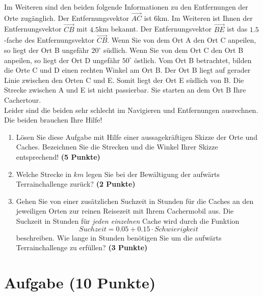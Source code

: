 \documentclass[a4paper, 9pt]{scrartcl}\usepackage[]{graphicx}\usepackage[]{xcolor}
\begin{document}
Im Weiteren sind den beiden folgende Informationen zu den Entfernungen der Orte zugänglich. Der Entfernungsvektor $\overrightarrow{AC}$ ist $6$km. Im Weiteren ist Ihnen der Entfernungsvektor $\overrightarrow{CB}$ mit $4.5$km bekannt. Der Entfernungsvektor $\overrightarrow{BE}$ ist das $1.5$-fache des Entfernungsvektor $\overrightarrow{CB}$. Wenn Sie von dem Ort A den Ort C anpeilen, so liegt der Ort B ungefähr $20^\circ$ südlich. Wenn Sie von dem Ort C den Ort B anpeilen, so liegt der Ort D ungefähr $50^\circ$ östlich. Vom Ort B betrachtet, bilden die Orte C und D einen rechten Winkel am Ort B. Der Ort B liegt auf gerader Linie zwischen den Orten C und E. Somit liegt der Ort E südlich von B. Die Strecke zwischen A und E ist nicht passierbar. Sie starten an dem Ort B Ihre Cachertour. \\

Leider sind die beiden sehr schlecht im Navigieren und Entfernungen ausrechnen. Die beiden brauchen Ihre Hilfe!
  
\begin{enumerate}
\item Lösen Sie diese Aufgabe mit Hilfe einer aussagekräftigen Skizze der Orte und Caches. Bezeichnen Sie die Strecken und die Winkel Ihrer Skizze entsprechend! \textbf{(5 Punkte)}
\item Welche Strecke in $km$ legen Sie bei der Bewältigung der aufwärts Terrainchallenge zurück? \textbf{(2 Punkte)}
\item Gehen Sie von einer zusätzlichen Suchzeit in Stunden für die Caches an den jeweiligen Orten zur reinen Reisezeit mit Ihrem Cachermobil aus. Die Suchzeit in Stunden für \textit{jeden einzelnen} Cache wird durch die Funktion  
  \begin{equation*}
    Suchzeit = 0.05 + 0.15 \cdot Schwierigkeit
  \end{equation*}  
  beschreiben.  Wie lange in Stunden benötigen Sie um die aufwärts Terrainchallenge zu erfüllen? \textbf{(3 Punkte)}
\end{enumerate}

 
\clearpage

\section{Aufgabe \hfill (10 Punkte)}
\end{document}
